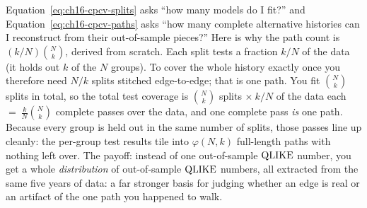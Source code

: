 \begin{intuition}
Equation~\eqref{eq:ch16-cpcv-splits} asks ``how many models do I fit?'' and Equation~\eqref{eq:ch16-cpcv-paths} asks ``how many complete alternative histories can I reconstruct from their out-of-sample pieces?''
Here is why the path count is $(k/N)\binom{N}{k}$, derived from scratch.
Each split tests a fraction $k/N$ of the data (it holds out $k$ of the $N$ groups).
To cover the whole history exactly once you therefore need $N/k$ splits stitched edge-to-edge; that is one path.
You fit $\binom{N}{k}$ splits in total, so the total test coverage is $\binom{N}{k}$ splits $\times\ k/N$ of the data each $=\ \frac{k}{N}\binom{N}{k}$ complete passes over the data, and one complete pass \emph{is} one path.
Because every group is held out in the same number of splits, those passes line up cleanly: the per-group test results tile into $\varphi(N,k)$ full-length paths with nothing left over.
The payoff: instead of one out-of-sample $\operatorname{QLIKE}$ number, you get a whole \emph{distribution} of out-of-sample $\operatorname{QLIKE}$ numbers, all extracted from the same five years of data: a far stronger basis for judging whether an edge is real or an artifact of the one path you happened to walk.
\end{intuition}

